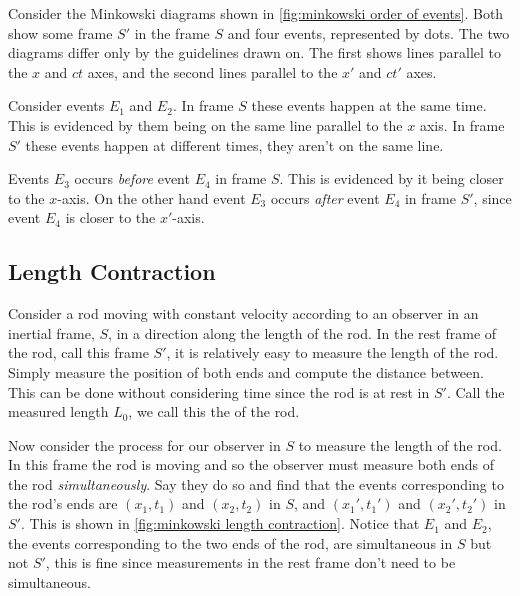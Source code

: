 \documentclass[fleqn]{NotesClass}
\begin{document}
    Consider the Minkowski diagrams shown in \cref{fig:minkowski order of events}.
    Both show some frame \(S'\) in the frame \(S\) and four events, represented by dots.
    The two diagrams differ only by the guidelines drawn on.
    The first shows lines parallel to the \(x\) and \(ct\) axes, and the second lines parallel to the \(x'\) and \(ct'\) axes.
    
    Consider events \(E_1\) and \(E_2\).
    In frame \(S\) these events happen at the same time.
    This is evidenced by them being on the same line parallel to the \(x\) axis.
    In frame \(S'\) these events happen at different times, they aren't on the same line.
    
    Events \(E_3\) occurs \emph{before} event \(E_4\) in frame \(S\).
    This is evidenced by it being closer to the \(x\)-axis.
    On the other hand event \(E_3\) occurs \emph{after} event \(E_4\) in frame \(S'\), since event \(E_4\) is closer to the \(x'\)-axis.
    
    \subsection{Length Contraction}
    Consider a rod moving with constant velocity according to an observer in an inertial frame, \(S\), in a direction along the length of the rod.
    In the rest frame of the rod, call this frame \(S'\), it is relatively easy to measure the length of the rod.
    Simply measure the position of both ends and compute the distance between.
    This can be done without considering time since the rod is at rest in \(S'\).
    Call the measured length \(L_0\), we call this the  of the rod.
    
    Now consider the process for our observer in \(S\) to measure the length of the rod.
    In this frame the rod is moving and so the observer must measure both ends of the rod \emph{simultaneously}.
    Say they do so and find that the events corresponding to the rod's ends are \((x_1, t_1)\) and \((x_2, t_2)\) in \(S\), and \((x_1', t_1')\) and \((x_2', t_2')\) in \(S'\).
    This is shown in \cref{fig:minkowski length contraction}.
    Notice that \(E_1\) and \(E_2\), the events corresponding to the two ends of the rod, are simultaneous in \(S\) but not \(S'\), this is fine since measurements in the rest frame don't need to be simultaneous.
    
\end{document}
